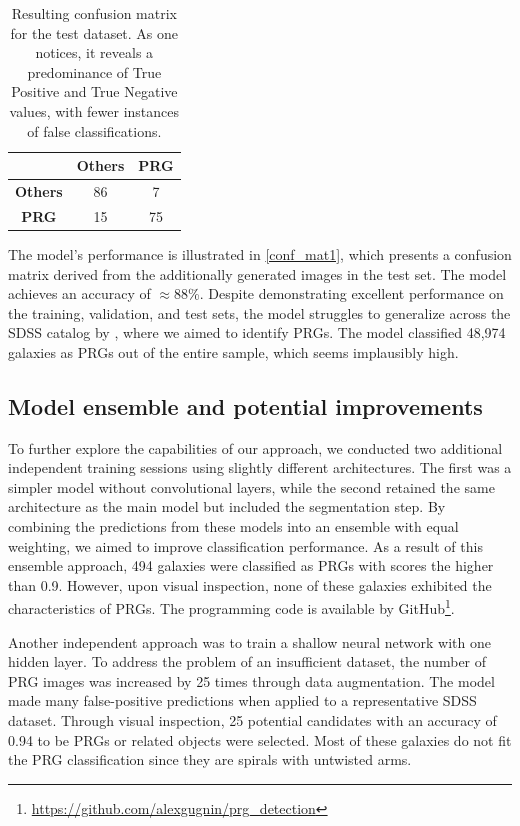 \documentclass{aa}
\begin{document}
\begin{table}[h!]
\centering
\caption{Resulting confusion matrix for the test dataset. As one notices, it reveals a predominance of True Positive and True Negative values, with fewer instances of false classifications.}
\begin{tabular}{|c|c|c|}
\hline
\textbf{}                  & \textbf{Others} & \textbf{PRG} \\ \hline
\textbf{Others} & 86                           & 7                          \\ \hline
\textbf{PRG}    & 15                           & 75                         \\ \hline
\end{tabular}
\label{conf_mat1}
\end{table}

The model's performance is illustrated in \autoref{conf_mat1}, which presents a confusion matrix derived from the additionally generated images in the test set. The model achieves an accuracy of $\approx$88\%. Despite demonstrating excellent performance on the training, validation, and test sets, the model struggles to generalize across the SDSS catalog by  \citep{Vavilova2021}, where we aimed to identify PRGs. The model classified 48,974 galaxies as PRGs out of the entire sample, which seems implausibly high.

\subsection{Model ensemble and potential improvements} 

To further explore the capabilities of our approach, we conducted two additional independent training sessions using slightly different architectures. The first was a simpler model without convolutional layers, while the second retained the same architecture as the main model but included the segmentation step. By combining the predictions from these models into an ensemble with equal weighting, we aimed to improve classification performance. As a result of this ensemble approach, 494 galaxies were classified as PRGs with scores the higher than 0.9. However, upon visual inspection, none of these galaxies exhibited the characteristics of PRGs. The programming code is available by GitHub\footnote{\url{https://github.com/alexgugnin/prg_detection}}.

Another independent approach was to train a shallow neural network with one hidden layer. To address the problem of an insufficient dataset, the number of PRG images was increased by 25 times through data augmentation. The model made many false-positive predictions when applied to a representative SDSS dataset. Through visual inspection, 25 potential candidates with an accuracy of 0.94 to be PRGs or related objects were selected. Most of these galaxies do not fit the PRG classification since they are spirals with untwisted arms. 
\end{document}
